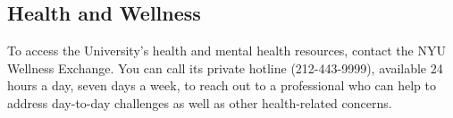 \documentclass[11pt]{article}
\begin{document}
\subsection*{Health and Wellness}
To access the University's health and mental health resources, contact the NYU Wellness Exchange.
You can call its private hotline (212-443-9999), available 24 hours a day, seven days a week, to reach out to a
professional who can help to address day-to-day challenges as well as other health-related concerns.


\end{document}

